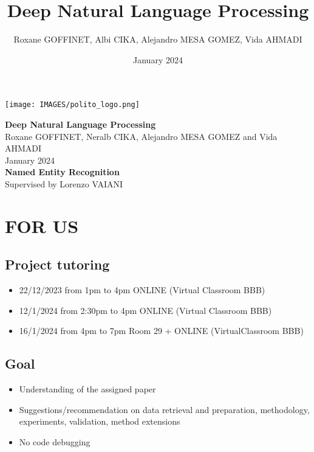\documentclass{article}
\title{Deep Natural Language Processing}
\author{Roxane GOFFINET, Albi CIKA, Alejandro MESA GOMEZ, Vida AHMADI}
\date{January 2024}
\begin{document}
\begin{titlepage}
\centering
\texttt{[image: IMAGES/polito\_logo.png]} 

\vspace{3cm}

\begin{center}
    \Huge{\textbf{Deep Natural Language Processing}}\\
    \vspace{2cm}
    \large{Roxane GOFFINET, Neralb CIKA, Alejandro MESA GOMEZ and Vida AHMADI}\\
    \vspace{1cm}
    January 2024\\
    \vspace{1.5cm}
    \Large\textbf{Named Entity Recognition}\\
    \vspace{7cm}
    \large{Supervised by Lorenzo VAIANI}
\end{center}

\end{titlepage} 

\newpage

\section*{FOR US }
\subsection*{Project tutoring}
\begin{itemize}
    \item 22/12/2023 from 1pm to 4pm ONLINE (Virtual Classroom BBB)
    \item 12/1/2024 from 2:30pm to 4pm ONLINE (Virtual Classroom BBB)
    \item 16/1/2024 from 4pm to 7pm Room 29 + ONLINE (VirtualClassroom BBB)
\end{itemize}

\subsection*{Goal}

\begin{itemize}
    \item Understanding of the assigned paper
    \item Suggestions/recommendation on data retrieval and preparation,
methodology, experiments, validation, method extensions
    \item No code debugging
\end{itemize}
\end{document}

